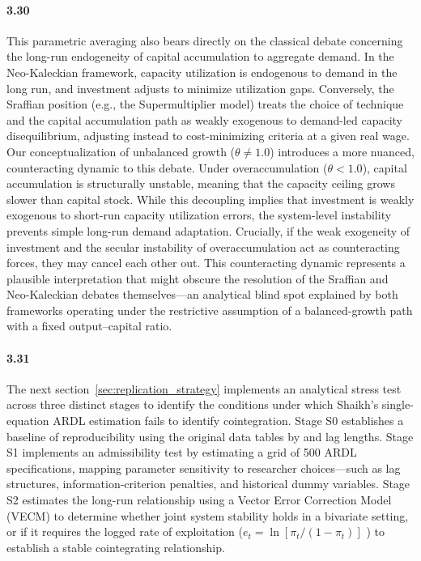 \paragraph{3.30}
This parametric averaging also bears directly on the classical debate concerning the long-run endogeneity of capital accumulation to aggregate demand. In the Neo-Kaleckian framework, capacity utilization is endogenous to demand in the long run, and investment adjusts to minimize utilization gaps. Conversely, the Sraffian position (e.g., the Supermultiplier model) treats the choice of technique and the capital accumulation path as weakly exogenous to demand-led capacity disequilibrium, adjusting instead to cost-minimizing criteria at a given real wage. Our conceptualization of unbalanced growth ($\theta \neq 1.0$) introduces a more nuanced, counteracting dynamic to this debate. Under overaccumulation ($\theta < 1.0$), capital accumulation is structurally unstable, meaning that the capacity ceiling grows slower than capital stock. While this decoupling implies that investment is weakly exogenous to short-run capacity utilization errors, the system-level instability prevents simple long-run demand adaptation. Crucially, if the weak exogeneity of investment and the secular instability of overaccumulation act as counteracting forces, they may cancel each other out. This counteracting dynamic represents a plausible interpretation that might obscure the resolution of the Sraffian and Neo-Kaleckian debates themselves---an analytical blind spot explained by both frameworks operating under the restrictive assumption of a balanced-growth path with a fixed output--capital ratio.

\paragraph{3.31}
The next section~\ref{sec:replication_strategy} implements an analytical stress test across three distinct stages to identify the conditions under which Shaikh's single-equation ARDL estimation fails to identify cointegration. Stage S0 establishes a baseline of reproducibility using the original data tables by \citet{Shaikh2016} and lag lengths. Stage S1 implements an admissibility test by estimating a grid of 500 ARDL specifications, mapping parameter sensitivity to researcher choices—such as lag structures, information-criterion penalties, and historical dummy variables. Stage S2 estimates the long-run relationship using a Vector Error Correction Model (VECM) to determine whether joint system stability holds in a bivariate setting, or if it requires the logged rate of exploitation ($e_t = \ln[\pi_t / (1 - \pi_t)]$ ) to establish a stable cointegrating relationship.

